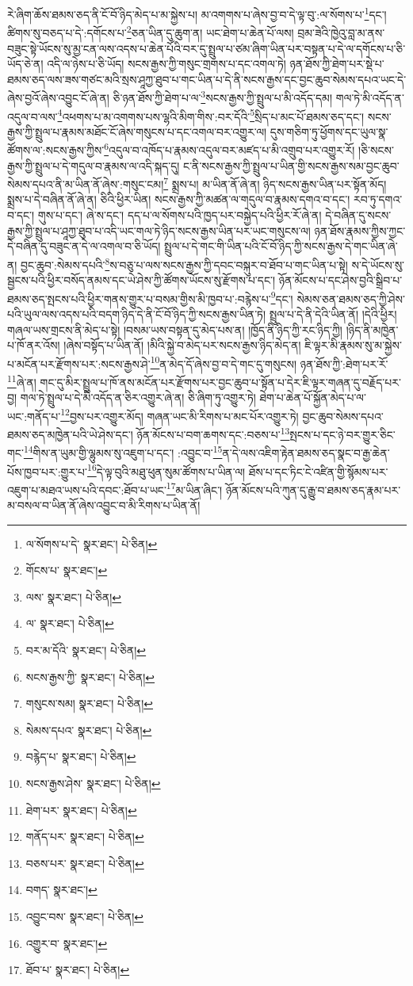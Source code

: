 རེ་ཞིག་ཆོས་ཐམས་ཅད་ནི་ངོ་བོ་ཉིད་མེད་པ་མ་སྐྱེས་པ། མ་འགགས་པ་ཞེས་བྱ་བ་དེ་ལྟ་བུ་:ལ་སོགས་པ་\footnote{ལ་སོགས་པ་དེ་  སྣར་ཐང་།  པེ་ཅིན། }དང་། ཚིགས་སུ་བཅད་པ་དེ་:དགོངས་པ་\footnote{གོངས་པ་  སྣར་ཐང་། }ཅན་ཡིན་དུ་ཆུག་ན། ཡང་ཐེག་པ་ཆེན་པོ་ལས། བྲམ་ཟེའི་ཁྱེའུ་བླ་མ་ནས་བཟུང་སྟེ་ཡོངས་སུ་མྱ་ངན་ལས་འདས་པ་ཆེན་པོའི་བར་དུ་སྤྲུལ་པ་ཙམ་ཞིག་ཡིན་པར་བསྟན་པ་དེ་ལ་དགོངས་པ་ཅི་ཡོད་ཅེ་ན། འདི་ལ་ཉེས་པ་ཅི་ཡོད། སངས་རྒྱས་ཀྱི་གསུང་གྲགས་པ་དང་འགལ་ཏེ། ཉན་ཐོས་ཀྱི་ཐེག་པར་སྡེ་པ་ཐམས་ཅད་ལས་ཟས་གཙང་མའི་སྲས་ཤཱཀྱ་ཐུབ་པ་གང་ཡིན་པ་དེ་ནི་སངས་རྒྱས་དང་བྱང་ཆུབ་སེམས་དཔའ་ཡང་དེ་ཞེས་བྱའོ་ཞེས་འབྱུང་ངོ་ཞེ་ན། ཅི་ཉན་ཐོས་ཀྱི་ཐེག་པ་ལ་\footnote{ལས་  སྣར་ཐང་།  པེ་ཅིན། }སངས་རྒྱས་ཀྱི་སྤྲུལ་པ་མི་འདོད་དམ། གལ་ཏེ་མི་འདོད་ན་འདུལ་བ་ལས་\footnote{ལ་  སྣར་ཐང་།  པེ་ཅིན། }འཕགས་པ་མ་འགགས་པས་ལྷའི་མིག་གིས་:བར་དོའི་\footnote{བར་མ་དོའི་  སྣར་ཐང་།  པེ་ཅིན། }སྲིད་པ་མང་པོ་ཐམས་ཅད་དང་། སངས་རྒྱས་ཀྱི་སྤྲུལ་པ་རྣམས་མཐོང་ངོ་ཞེས་གསུངས་པ་དང་འགལ་བར་འགྱུར་ལ། དུས་གཅིག་ཏུ་ཕྱོགས་དང་ཡུལ་སྣ་ཚོགས་ལ་:སངས་རྒྱས་ཀྱིས་\footnote{སངས་རྒྱས་ཀྱི་  སྣར་ཐང་།  པེ་ཅིན། }འདུལ་བ་འཁོད་པ་རྣམས་འདུལ་བར་མཛད་པ་མི་འགྲུབ་པར་འགྱུར་རོ། །ཅི་སངས་རྒྱས་ཀྱི་སྤྲུལ་པ་དེ་གདུལ་བ་རྣམས་ལ་འདི་སྐད་དུ། ང་ནི་སངས་རྒྱས་ཀྱི་སྤྲུལ་པ་ཡིན་གྱི་སངས་རྒྱས་སམ་བྱང་ཆུབ་སེམས་དཔའ་ནི་མ་ཡིན་ནོ་ཞེས་:གསུང་ངམ།\footnote{གསུངས་སམ།  སྣར་ཐང་།  པེ་ཅིན། } སྨྲས་པ། མ་ཡིན་ནོ་ཞེ་ན། ཉིད་སངས་རྒྱས་ཡིན་པར་སྟོན་མོད། སྨྲས་པ་དེ་བཞིན་ནོ་ཞེ་ན། ཅིའི་ཕྱིར་ཡིན། སངས་རྒྱས་ཀྱི་མཚན་ལ་གདུལ་བ་རྣམས་དགའ་བ་དང་། རབ་ཏུ་དགའ་བ་དང་། གུས་པ་དང་། ཞེ་ས་དང་། དད་པ་ལ་སོགས་པའི་ཁྱད་པར་བསྐྱེད་པའི་ཕྱིར་རོ་ཞེ་ན། དེ་བཞིན་དུ་སངས་རྒྱས་ཀྱི་སྤྲུལ་པ་ཤཱཀྱ་ཐུབ་པ་འདི་ཡང་གལ་ཏེ་ཉིད་སངས་རྒྱས་ཡིན་པར་ཡང་གསུངས་ལ། ཉན་ཐོས་རྣམས་ཀྱིས་ཀྱང་དེ་བཞིན་དུ་བཟུང་ན་དེ་ལ་འགལ་བ་ཅི་ཡོད། སྤྲུལ་པ་དེ་གང་གི་ཡིན་པའི་ངོ་བོ་ཉིད་ཀྱི་སངས་རྒྱས་དེ་གང་ཡིན་ཞེ་ན། བྱང་ཆུབ་:སེམས་དཔའི་\footnote{སེམས་དཔའ་  སྣར་ཐང་།  པེ་ཅིན། }ས་བཅུ་པ་ལས་སངས་རྒྱས་ཀྱི་དབང་བསྐུར་བ་ཐོབ་པ་གང་ཡིན་པ་སྟེ། ས་དེ་ཡོངས་སུ་སྦྱངས་པའི་ཕྱིར་བསོད་ནམས་དང་ཡེ་ཤེས་ཀྱི་ཚོགས་ཡོངས་སུ་རྫོགས་པ་དང་། ཉོན་མོངས་པ་དང་ཤེས་བྱའི་སྒྲིབ་པ་ཐམས་ཅད་སྤངས་པའི་ཕྱིར་གནས་གྱུར་པ་བསམ་གྱིས་མི་ཁྱབ་པ་:བརྙེས་པ་\footnote{བརྙེད་པ་  སྣར་ཐང་།  པེ་ཅིན། }དང་། སེམས་ཅན་ཐམས་ཅད་ཀྱི་ཤེས་པའི་ཡུལ་ལས་འདས་པའི་བདག་ཉིད་དེ་ནི་ངོ་བོ་ཉིད་ཀྱི་སངས་རྒྱས་ཡིན་ཏེ། སྤྲུལ་པ་དེ་ནི་དེའི་ཡིན་ནོ། །དེའི་ཕྱིར། གཞལ་ཡས་གྲངས་ནི་མེད་པ་སྟེ། །བསམ་ཡས་བསྟན་དུ་མེད་པས་ན། །ཁྱོད་ནི་ཉིད་ཀྱི་རང་ཉིད་ཀྱི། །ཉིད་ནི་མཁྱེན་པ་ཁོ་ནར་འོས། །ཞེས་བསྟོད་པ་ཡིན་ནོ། །མིའི་སྐྱེ་བ་མེད་པར་སངས་རྒྱས་ཉིད་མེད་ན། ཇི་ལྟར་མི་རྣམས་སུ་མ་སྐྱེས་པ་མངོན་པར་རྫོགས་པར་:སངས་རྒྱས་ཤེ་\footnote{སངས་རྒྱས་ཤེས་  སྣར་ཐང་།  པེ་ཅིན། }ན་མེད་དོ་ཞེས་བྱ་བ་དེ་གང་དུ་གསུངས། ཉན་ཐོས་ཀྱི་:ཐེག་པར་རོ་\footnote{ཐེག་པར་  སྣར་ཐང་།  པེ་ཅིན། }ཞེ་ན། གང་དུ་མིར་སྤྲུལ་པ་ཁོ་ནས་མངོན་པར་རྫོགས་པར་བྱང་ཆུབ་པ་སྟོན་པ་དེར་ཇི་ལྟར་གཞན་དུ་བརྗོད་པར་བྱ། གལ་ཏེ་སྤྲུལ་པ་དེ་མི་འདོད་ན་ཅིར་འགྱུར་ཞེ་ན། ཅི་ཞིག་ཏུ་འགྱུར་ཏེ། ཐེག་པ་ཆེན་པོ་སྐྱོན་མེད་པ་ལ་ཡང་:གནོད་པ་\footnote{གནོད་པར་  སྣར་ཐང་།  པེ་ཅིན། }བྱས་པར་འགྱུར་མོད། གཞན་ཡང་མི་རིགས་པ་མང་པོར་འགྱུར་ཏེ། བྱང་ཆུབ་སེམས་དཔའ་ཐམས་ཅད་མཁྱེན་པའི་ཡེ་ཤེས་དང་། ཉོན་མོངས་པ་བག་ཆགས་དང་:བཅས་པ་\footnote{བཅས་པར་  སྣར་ཐང་།  པེ་ཅིན། }སྤངས་པ་དང་ཉེ་བར་གྱུར་ཅིང་གང་\footnote{བགད་  སྣར་ཐང་། }གིས་ན་ཡུམ་གྱི་ལྷུམས་སུ་འཇུག་པ་དང་། :འབྱུང་བ་\footnote{འབྱུང་བས་  སྣར་ཐང་།  པེ་ཅིན། }ན་དེ་ལས་འཇིག་རྟེན་ཐམས་ཅད་སྣང་བ་རྒྱ་ཆེན་པོས་ཁྱབ་པར་:གྱུར་པ་\footnote{འགྱུར་བ་  སྣར་ཐང་། }དེ་ལྟ་བུའི་མཐུ་ཕུན་སུམ་ཚོགས་པ་ཡིན་ལ། ཐོས་པ་དང་ཏིང་ངེ་འཛིན་གྱི་སྙོམས་པར་འཇུག་པ་མཐའ་ཡས་པའི་དབང་:ཐོབ་པ་ཡང་\footnote{ཐོབ་པ་  སྣར་ཐང་།  པེ་ཅིན། }མ་ཡིན་ཞིང་། ཉོན་མོངས་པའི་ཀུན་དུ་རྒྱུ་བ་ཐམས་ཅད་རྣམ་པར་མ་བསལ་བ་ཡིན་ནོ་ཞེས་འབྱུང་བ་མི་རིགས་པ་ཡིན་ནོ། 